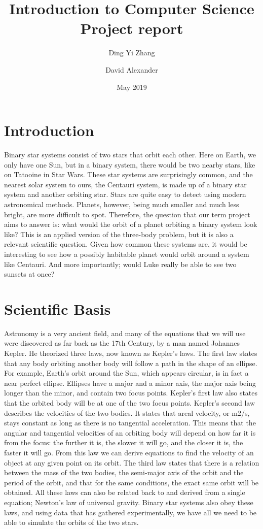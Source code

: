 \documentclass{article}
\title{Introduction to Computer Science\\ Project report}
\author{Ding Yi Zhang
\and David Alexander}
\date{May 2019}
\begin{document}
\begin{titlepage}
\maketitle
\end{titlepage}

\section{Introduction}
Binary star systems consist of two stars that orbit each other. Here on Earth, we only have one Sun, but in a binary system, there would be two nearby stars, like on Tatooine in Star Wars. These star systems are surprisingly common, and the nearest solar system to ours, the Centauri system, is made up of a binary star system and another orbiting star. Stars are quite easy to detect using modern astronomical methods. Planets, however, being much smaller and much less bright, are more difficult to spot. Therefore, the question that our term project aims to answer is: what would the orbit of a planet orbiting a binary system look like? This is an applied version of the three-body problem, but it is also a relevant scientific question. Given how common these systems are, it would be interesting to see how a possibly habitable planet would orbit around a system like Centauri. And more importantly; would Luke really be able to see two sunsets at once?

\section{Scientific Basis}
Astronomy is a very ancient field, and many of the equations that we will use were discovered as far back as the 17th Century, by a man named Johannes Kepler. He theorized three laws, now known as Kepler’s laws. The first law states that any body orbiting another body will follow a path in the shape of an ellipse. For example, Earth’s orbit around the Sun, which appears circular, is in fact a near perfect ellipse. Ellipses have a major and a minor axis, the major axis being longer than the minor, and contain two focus points. Kepler’s first law also states that the orbited body will be at one of the two focus points. Kepler’s second law describes the velocities of the two bodies. It states that areal velocity, or m2/s, stays constant as long as there is no tangential acceleration. This means that the angular and tangential velocities of an orbiting body will depend on how far it is from the focus: the further it is, the slower it will go, and the closer it is, the faster it will go. From this law we can derive equations to find the velocity of an object at any given point on its orbit. The third law states that there is a relation between the mass of the two bodies, the semi-major axis of the orbit and the period of the orbit, and that for the same conditions, the exact same orbit will be obtained. All these laws can also be related back to and derived from a single equation; Newton’s law of universal gravity.  Binary star systems also obey these laws, and using data that has gathered experimentally, we have all we need to be able to simulate the orbits of the two stars.
\end{document}
